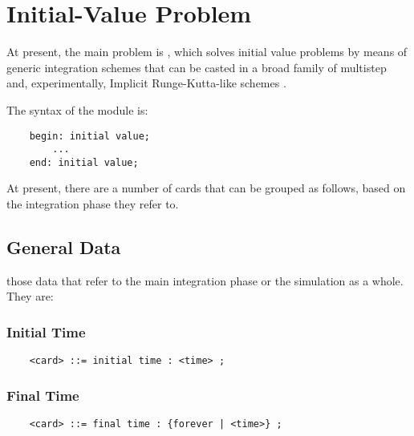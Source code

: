 \section{Initial-Value Problem}
\label{sec:IVP}
At present, the main problem is ,
which solves initial value problems
by means of generic integration schemes that can be casted
in a broad family of multistep and, experimentally,
Implicit Runge-Kutta-like schemes
\cite{MASARATI-LANZ-MANTEGAZZA-2001}.

The syntax of the module is:
\begin{verbatim}
    begin: initial value;
        ...
    end: initial value;
\end{verbatim}
At present, there are a number of cards that can be grouped as follows, 
based on the integration phase they refer to.

\subsection{General Data}
those data that refer to the main integration phase or the simulation as a
whole. They are:

\subsubsection{Initial Time}
\begin{verbatim}
    <card> ::= initial time : <time> ;
\end{verbatim}

\subsubsection{Final Time}
\begin{verbatim}
    <card> ::= final time : {forever | <time>} ;
\end{verbatim}

